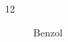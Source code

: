 
\normalsize{12}

\maketitle


\begin{figure}[h]
    \centering
    \caption{Benzol}
    \label{fig:Benzol}
\end{figure}



